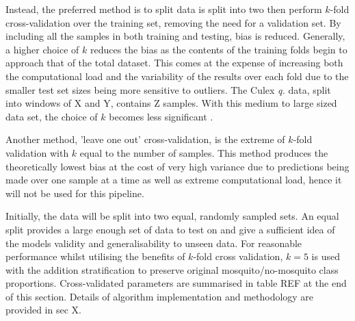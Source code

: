         Instead, the preferred method is to split data is split into two then perform $k$-fold cross-validation over the training set, removing the need for a validation set. By including all the samples in both training and testing, bias is reduced. Generally, a higher choice of $k$ reduces the bias as the contents of the training folds begin to approach that of the total dataset. This comes at the expense of increasing both the computational load and the variability of the results over each fold due to the smaller test set sizes being more sensitive to outliers. The Culex \textit{q.} data, split into windows of X and Y, contains Z samples. With this medium to large sized data set, the choice of $k$ becomes less significant \cite{Kohavi1995}. 
        
        Another method, 'leave one out' cross-validation, is the extreme of $k$-fold validation with $k$ equal to the number of samples. This method produces the theoretically lowest bias at the cost of very high variance due to predictions being made over one sample at a time as well as extreme computational load, hence it will not be used for this pipeline.

        Initially, the data will be split into two equal, randomly sampled sets. An equal split provides a large enough set of data to test on and give a sufficient idea of the models validity and generalisability to unseen data. For reasonable performance whilst utilising the benefits of $k$-fold cross validation, $k=5$ is used with the addition stratification to preserve original mosquito/no-mosquito class proportions. Cross-validated parameters are summarised in table REF at the end of this section. Details of algorithm implementation and methodology are provided in sec X.
        
        
    
        
     
         
  
